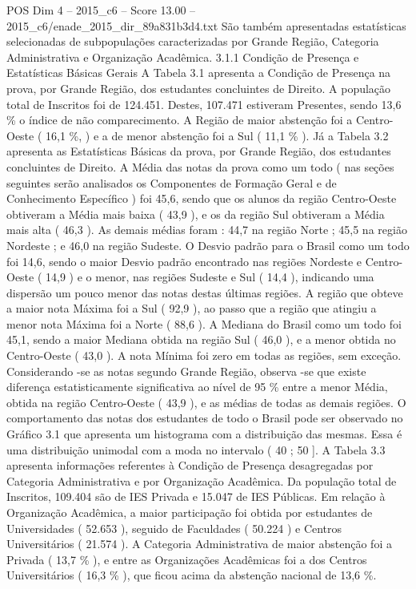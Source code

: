\begin{textsample}{POS Dim 4 – 2015\_c6 – Score 13.00 – 2015\_c6/enade\_2015\_dir\_89a831b3d4.txt}
São também apresentadas estatísticas selecionadas de subpopulações caracterizadas por Grande Região, Categoria Administrativa e Organização Acadêmica. 3.1.1 Condição de Presença e Estatísticas Básicas Gerais A Tabela 3.1 apresenta a Condição de Presença na prova, por Grande Região, dos estudantes concluintes de Direito.
A população total de Inscritos foi de 124.451.
Destes, 107.471 estiveram Presentes, sendo 13,6 \% o índice de não comparecimento.
A Região de maior abstenção foi a Centro-Oeste ( 16,1 \%, ) e a de menor abstenção foi a Sul ( 11,1 \% ).
Já a Tabela 3.2 apresenta as Estatísticas Básicas da prova, por Grande Região, dos estudantes concluintes de Direito.
A Média das notas da prova como um todo ( nas seções seguintes serão analisados os Componentes de Formação Geral e de Conhecimento Específico ) foi 45,6, sendo que os alunos da região Centro-Oeste obtiveram a Média mais baixa ( 43,9 ), e os da região Sul obtiveram a Média mais alta ( 46,3 ).
As demais médias foram : 44,7 na região Norte ; 45,5 na região Nordeste ; e 46,0 na região Sudeste.
O Desvio padrão para o Brasil como um todo foi 14,6, sendo o maior Desvio padrão encontrado nas regiões Nordeste e Centro-Oeste ( 14,9 ) e o menor, nas regiões Sudeste e Sul ( 14,4 ), indicando uma dispersão um pouco menor das notas destas últimas regiões.
A região que obteve a maior nota Máxima foi a Sul ( 92,9 ), ao passo que a região que atingiu a menor nota Máxima foi a Norte ( 88,6 ).
A Mediana do Brasil como um todo foi 45,1, sendo a maior Mediana obtida na região Sul ( 46,0 ), e a menor obtida no Centro-Oeste ( 43,0 ).
A nota Mínima foi zero em todas as regiões, sem exceção.
Considerando -se as notas segundo Grande Região, observa -se que existe diferença estatisticamente significativa ao nível de 95 \% entre a menor Média, obtida na região Centro-Oeste ( 43,9 ), e as médias de todas as demais regiões.
O comportamento das notas dos estudantes de todo o Brasil pode ser observado no Gráfico 3.1 que apresenta um histograma com a distribuição das mesmas.
Essa é uma distribuição unimodal com a moda no intervalo ( 40 ; 50 ].
A Tabela 3.3 apresenta informações referentes à Condição de Presença desagregadas por Categoria Administrativa e por Organização Acadêmica.
Da população total de Inscritos, 109.404 são de IES Privada e 15.047 de IES Públicas.
Em relação à Organização Acadêmica, a maior participação foi obtida por estudantes de Universidades ( 52.653 ), seguido de Faculdades ( 50.224 ) e Centros Universitários ( 21.574 ).
A Categoria Administrativa de maior abstenção foi a Privada ( 13,7 \% ), e entre as Organizações Acadêmicas foi a dos Centros Universitários ( 16,3 \% ), que ficou acima da abstenção nacional de 13,6 \%.

\end{textsample}
